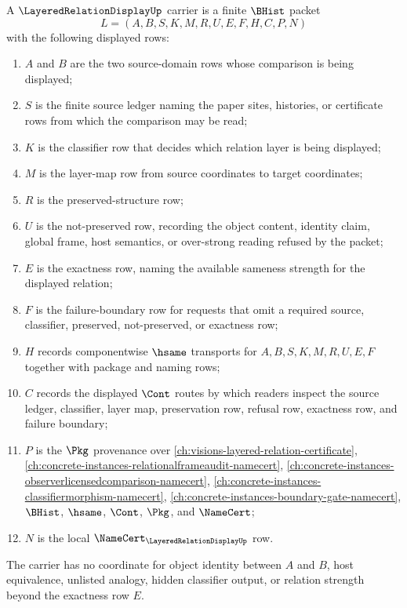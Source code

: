 \begin{definition}
\label{def:layered-relation-display-carrier}
A $\LayeredRelationDisplayUp$ carrier is a finite $\BHist$ packet
$$
L=(A,B,S,K,M,R,U,E,F,H,C,P,N)
$$
with the following displayed rows:
\begin{enumerate}
\item $A$ and $B$ are the two source-domain rows whose comparison is being displayed;
\item $S$ is the finite source ledger naming the paper sites, histories, or certificate rows from which the comparison may be read;
\item $K$ is the classifier row that decides which relation layer is being displayed;
\item $M$ is the layer-map row from source coordinates to target coordinates;
\item $R$ is the preserved-structure row;
\item $U$ is the not-preserved row, recording the object content, identity claim, global frame, host semantics, or over-strong reading refused by the packet;
\item $E$ is the exactness row, naming the available sameness strength for the displayed relation;
\item $F$ is the failure-boundary row for requests that omit a required source, classifier, preserved, not-preserved, or exactness row;
\item $H$ records componentwise $\hsame$ transports for $A,B,S,K,M,R,U,E,F$ together with package and naming rows;
\item $C$ records the displayed $\Cont$ routes by which readers inspect the source ledger, classifier, layer map, preservation row, refusal row, exactness row, and failure boundary;
\item $P$ is the $\Pkg$ provenance over \autoref{ch:visions-layered-relation-certificate}, \autoref{ch:concrete-instances-relationalframeaudit-namecert}, \autoref{ch:concrete-instances-observerlicensedcomparison-namecert}, \autoref{ch:concrete-instances-classifiermorphism-namecert}, \autoref{ch:concrete-instances-boundary-gate-namecert}, $\BHist$, $\hsame$, $\Cont$, $\Pkg$, and $\NameCert$;
\item $N$ is the local $\NameCert_{\LayeredRelationDisplayUp}$ row.
\end{enumerate}
The carrier has no coordinate for object identity between $A$ and $B$, host equivalence, unlisted analogy, hidden classifier output, or relation strength beyond the exactness row $E$.
\end{definition}

